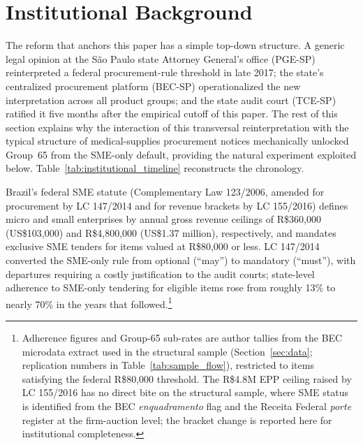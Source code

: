 \section{Institutional Background}\label{sec:institutional}

The reform that anchors this paper has a simple top-down structure. A generic legal opinion at the São Paulo state Attorney General's office (PGE-SP) reinterpreted a federal procurement-rule threshold in late 2017; the state's centralized procurement platform (BEC-SP) operationalized the new interpretation across all product groups; and the state audit court (TCE-SP) ratified it five months after the empirical cutoff of this paper. The rest of this section explains why the interaction of this transversal reinterpretation with the typical structure of medical-supplies procurement notices mechanically unlocked Group~65 from the SME-only default, providing the natural experiment exploited below. Table~\ref{tab:institutional_timeline} reconstructs the chronology.

Brazil's federal SME statute (Complementary Law 123/2006, amended for procurement by LC 147/2014 and for revenue brackets by LC 155/2016) defines micro and small enterprises by annual gross revenue ceilings of R\$360{,}000 (US\$103{,}000) and R\$4{,}800{,}000 (US\$1.37 million), respectively, and mandates exclusive SME tenders for items valued at R\$80{,}000 or less. LC 147/2014 converted the SME-only rule from optional (``may'') to mandatory (``must''), with departures requiring a costly justification to the audit courts; state-level adherence to SME-only tendering for eligible items rose from roughly 13\% to nearly 70\% in the years that followed.\footnote{Adherence figures and Group-65 sub-rates are author tallies from the BEC microdata extract used in the structural sample (Section~\ref{sec:data}; replication numbers in Table~\ref{tab:sample_flow}), restricted to items satisfying the federal R\$80{,}000 threshold. The R\$4.8M EPP ceiling raised by LC 155/2016 has no direct bite on the structural sample, where SME status is identified from the BEC \emph{enquadramento} flag and the Receita Federal \emph{porte} register at the firm-auction level; the bracket change is reported here for institutional completeness.}

